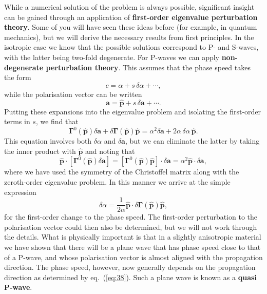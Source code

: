 While a numerical solution of the problem is always possible, significant insight 
can be gained through an application of \textbf{first-order eigenvalue perturbation theory}. Some of you will have seen these 
ideas before (for example, in quantum mechanics), but we will derive the necessary results from first principles. 
In the isotropic case we know that the possible solutions correspond to P- and S-waves, with the latter being two-fold degenerate. 
For P-waves we can apply \textbf{non-degenerate perturbation theory}. This assumes that the phase speed takes the form
\begin{equation}
c=\alpha+s\,\delta\alpha+\cdots,
\label{eq:34}
\end{equation}
while the polarisation vector can be written
\begin{equation}
\mathbf{a}=\hat{\mathbf{p}}+s\,\delta \mathbf{a}+\cdots.
\label{eq:35}
\end{equation}
Putting these expansions into the eigenvalue problem and isolating the first-order terms in $s$, we find that
\begin{equation}
\bm{\Gamma}^{0}(\hat{\mathbf{p}})\delta \mathbf{a}+\delta\bm{\Gamma}(\hat{\mathbf{p}})\hat{\mathbf{p}}=\alpha^{2}\delta 
\mathbf{a}+2\alpha\,\delta\alpha\,\hat{\mathbf{p}}.
\label{eq:36}
\end{equation}
This equation involves both $\delta\alpha$ and $\delta \mathbf{a}$, but we can eliminate the latter by taking the inner product 
with $\hat{\mathbf{p}}$ and noting that
\begin{equation}
\hat{\mathbf{p}}\cdot[\bm{\Gamma}^{0}(\hat{\mathbf{p}})\delta \mathbf{a}]=[\bm{\Gamma}^{0}(\hat{\mathbf{p}})\hat{\mathbf{p}}]\cdot\delta
 \mathbf{a}=\alpha^{2}\hat{\mathbf{p}}\cdot\delta \mathbf{a}, 
\label{eq:37}
\end{equation}
where we have used the symmetry of the Christoffel matrix along with the zeroth-order eigenvalue problem. In this manner we 
arrive at the simple expression
\begin{equation}
\delta\alpha=\frac{1}{2\alpha}\hat{\mathbf{p}}\cdot\delta\bm{\Gamma}(\hat{\mathbf{p}})\hat{\mathbf{p}}, 
\label{eq:38}
\end{equation}
for the first-order change to the phase speed. The first-order perturbation to the polarisation vector could then also be determined, 
but we will not work through the details. What is physically important is that in a slightly anisotropic material 
we have shown that there will be a plane wave that has phase speed close to that of a P-wave, and whose polarisation vector is 
almost aligned with the propagation direction. The phase speed, however, now generally depends on the propagation direction as determined 
by eq.~(\ref{eq:38}). Such a plane wave is known as a \textbf{quasi P-wave}.

